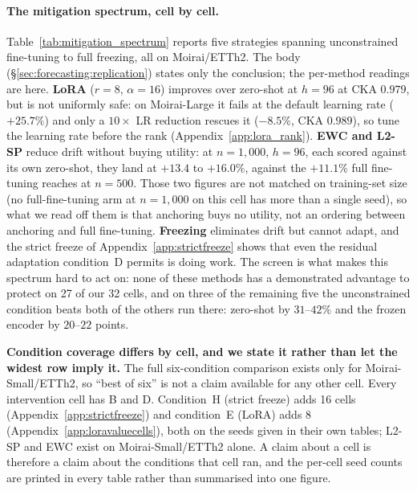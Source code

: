 \paragraph{The mitigation spectrum, cell by cell.}
Table~\ref{tab:mitigation_spectrum} reports five strategies spanning
unconstrained fine-tuning to full freezing, all on Moirai/ETTh2. The body
(\S\ref{sec:forecasting:replication}) states only the conclusion; the per-method
readings are here. \textbf{LoRA} ($r{=}8$, $\alpha{=}16$) improves over
zero-shot at $h{=}96$ at CKA $0.979$, but is not uniformly safe: on
Moirai-Large it fails at the default learning rate ($+25.7\%$) and only a
$10\times$ LR reduction rescues it ($-8.5\%$, CKA $0.989$), so tune the
learning rate before the rank (Appendix~\ref{app:lora_rank}). \textbf{EWC and
L2-SP} reduce drift without buying utility: at $n{=}1{,}000$, $h{=}96$, each
scored against its own zero-shot, they land at $+13.4$ to $+16.0\%$, against the
$+11.1\%$ full fine-tuning reaches at $n{=}500$.  Those two figures are not
matched on training-set size (no full-fine-tuning arm at $n{=}1{,}000$ on this
cell has more than a single seed), so what we read off them is that anchoring
buys no utility, not an ordering between anchoring and full fine-tuning. \textbf{Freezing} eliminates drift but cannot adapt, and the
strict freeze of Appendix~\ref{app:strictfreeze} shows that even the residual
adaptation condition~D permits is doing work. The screen is what makes this
spectrum hard to act on: none of these methods has a demonstrated advantage to
protect on 27 of our 32 cells, and on three of the remaining five the
unconstrained condition beats both of the others run there: zero-shot by
$31$--$42\%$ and the frozen encoder by $20$--$22$ points.

\textbf{Condition coverage differs by cell, and we state it rather than let the
widest row imply it.} The full six-condition comparison exists only for
Moirai-Small/ETTh2, so ``best of six'' is not a claim available for any other
cell. Every intervention cell has B and D. Condition~H (strict freeze) adds 16
cells (Appendix~\ref{app:strictfreeze}) and condition~E (LoRA) adds 8
(Appendix~\ref{app:loravaluecells}), both on the seeds given in their own tables;
L2-SP and EWC exist on Moirai-Small/ETTh2 alone. A claim about a cell is
therefore a claim about the conditions that cell ran, and the per-cell seed
counts are printed in every table rather than summarised into one figure.



